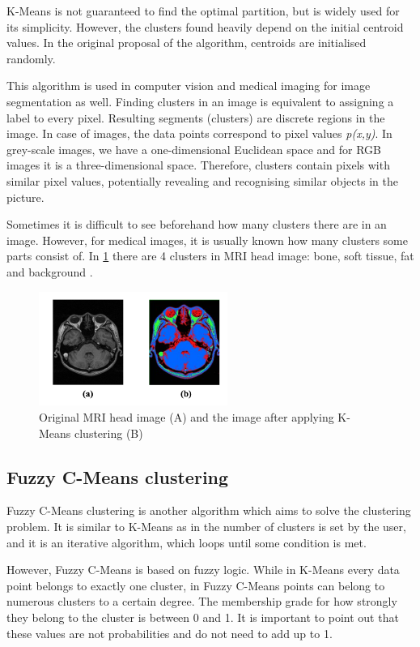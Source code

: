 K-Means is not guaranteed to find the optimal partition, but is widely used for its simplicity. However, the clusters found heavily depend on the initial centroid values. In the original proposal of the algorithm, centroids are initialised randomly.  

This algorithm is used in computer vision and medical imaging for image segmentation as well. Finding clusters in an image is equivalent to assigning a label to every pixel. Resulting segments (clusters) are discrete regions in the image. In case of images, the data points correspond to pixel values \textit{p(x,y)}. In grey-scale images, we have a one-dimensional Euclidean space and for RGB images it is a three-dimensional space. Therefore, clusters contain pixels with similar pixel values, potentially revealing and recognising similar objects in the picture. 

Sometimes it is difficult to see beforehand how many clusters there are in an image. However, for medical images, it is usually known how many clusters some parts consist of. In \ref{fig:kmeans} there are 4 clusters in MRI head image: bone, soft tissue, fat and background \cite{ng2006}.



\begin{figure}[ht]
    \centering
    \includegraphics[width=175pt]{images/kmeans.png}
    \caption[K-Means clustering]{Original MRI head image (A) and the image after applying K-Means clustering (B) \cite{ng2006}}
    \label{fig:kmeans}
\end{figure}

\subsection{Fuzzy C-Means clustering}
Fuzzy C-Means clustering \cite{bezdek1981} is another algorithm which aims to solve the clustering problem. It is similar to K-Means as in the number of clusters is set by the user, and it is an iterative algorithm, which loops until some condition is met. 

However, Fuzzy C-Means is based on fuzzy logic. While in K-Means every data point belongs to exactly one cluster, 
in Fuzzy C-Means points can belong to numerous clusters to a certain degree. The membership grade for how strongly they belong to the cluster is between 0 and 1. It is important to point out that these values are not probabilities and do not need to add up to 1.

